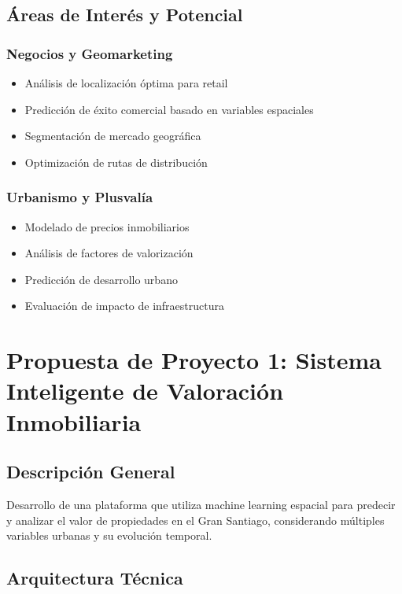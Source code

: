 \documentclass[12pt,a4paper]{article}
\begin{document}
\subsection{Áreas de Interés y Potencial}

\subsubsection{Negocios y Geomarketing}
\begin{itemize}
    \item Análisis de localización óptima para retail
    \item Predicción de éxito comercial basado en variables espaciales
    \item Segmentación de mercado geográfica
    \item Optimización de rutas de distribución
\end{itemize}

\subsubsection{Urbanismo y Plusvalía}
\begin{itemize}
    \item Modelado de precios inmobiliarios
    \item Análisis de factores de valorización
    \item Predicción de desarrollo urbano
    \item Evaluación de impacto de infraestructura
\end{itemize}

\section{Propuesta de Proyecto 1: Sistema Inteligente de Valoración Inmobiliaria}

\subsection{Descripción General}

Desarrollo de una plataforma que utiliza machine learning espacial para predecir y analizar el valor de propiedades en el Gran Santiago, considerando múltiples variables urbanas y su evolución temporal.

\subsection{Arquitectura Técnica}
\end{document}
